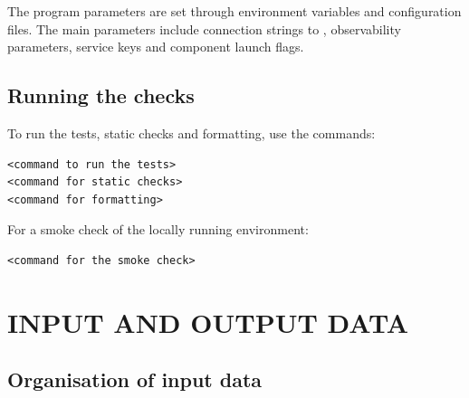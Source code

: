 \documentclass[12pt,a4paper]{extarticle}
\begin{document}
\begin{hseExample}
The program parameters are set through environment variables and configuration files. The main parameters include connection strings to , observability parameters, service keys and component launch flags.
\end{hseExample}

\subsection{Running the checks}

\begin{hseExample}
To run the tests, static checks and formatting, use the commands:

\begin{verbatim}
<command to run the tests>
<command for static checks>
<command for formatting>
\end{verbatim}

For a smoke check of the locally running environment:

\begin{verbatim}
<command for the smoke check>
\end{verbatim}
\end{hseExample}

\clearpage

\section{INPUT AND OUTPUT DATA}

\subsection{Organisation of input data}
\end{document}
